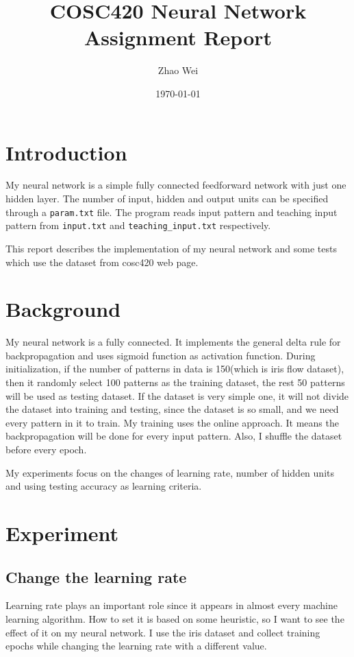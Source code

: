 \documentclass[11pt]{article}
\author{Zhao Wei}
\date{\today}
\title{COSC420 Neural Network Assignment Report}
\begin{document}
\maketitle
\tableofcontents


\section{Introduction}
\label{sec-1}
My neural network is a simple fully connected feedforward network with just one hidden layer. The number of input, hidden and output units can be specified through a \texttt{param.txt} file. The program reads input pattern and teaching input pattern from \texttt{input.txt} and \texttt{teaching\_input.txt} respectively. 

This report describes the implementation of my neural network and some tests which use the dataset from cosc420 web page. 
\section{Background}
\label{sec-2}
My neural network is a fully connected. It implements the general delta rule for backpropagation and uses sigmoid function as activation function. During initialization, if the number of patterns in data is 150(which is iris flow dataset), then it randomly select 100 patterns as the training dataset, the rest 50 patterns will be used as testing dataset. If the dataset is very simple one, it will not divide the dataset into training and testing, since the dataset is so small, and we need every pattern in it to train. My training uses the online approach. It means the backpropagation will be done for every input pattern. Also, I shuffle the dataset before every epoch.

My experiments focus on the changes of learning rate, number of hidden units and using testing accuracy as learning criteria.

\section{Experiment}
\label{sec-3}
\subsection{Change the learning rate}
\label{sec-3-1}
Learning rate plays an important role since it appears in almost every machine learning algorithm. How to set it is based on some heuristic, so I want to see the effect of it on my neural network. I use the iris dataset and collect training epochs while changing the learning rate with a different value.
\end{document}
